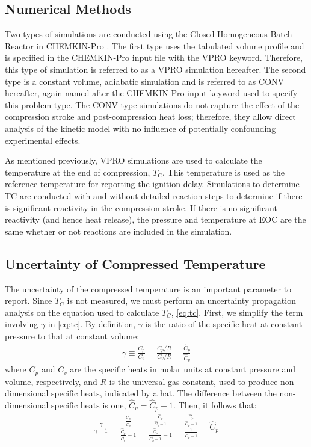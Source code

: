 \documentclass[../main.tex]{subfiles}
\begin{document}
\subsection{Numerical Methods}
Two types of simulations are conducted using the Closed Homogeneous
Batch Reactor in CHEMKIN-Pro \cite{Chemkin2012}. The first type uses the
tabulated volume profile and is specified in the CHEMKIN-Pro input file
with the VPRO keyword. Therefore, this type of simulation is referred to
as a VPRO simulation hereafter. The second type is a constant volume,
adiabatic simulation and is referred to as CONV hereafter, again named
after the CHEMKIN-Pro input keyword used to specify this problem type.
The CONV type simulations do not capture the effect of the compression
stroke and post-compression heat loss; therefore, they allow direct
analysis of the kinetic model with no influence of potentially
confounding experimental effects.

As mentioned previously, VPRO simulations are used to calculate the
temperature at the end of compression, $T_C$. This temperature is used
as the reference temperature for reporting the ignition delay.
Simulations to determine TC are conducted with and without detailed
reaction steps to determine if there is significant reactivity in the
compression stroke. If there is no significant reactivity
(and hence heat release), the pressure and temperature at EOC are the
same whether or not reactions are included in the simulation.

\subsection{Uncertainty of Compressed Temperature}
\label{sec:uncertainty}

The uncertainty of the compressed temperature is an important parameter
to report. Since $T_C$ is not measured, we must perform an uncertainty
propagation analysis on the equation used to calculate $T_C$,
\cref{eq:tc}. First, we simplify the term involving $\gamma$ in
\cref{eq:tc}. By definition, $\gamma$ is the ratio of the specific heat
at constant pressure to that at constant volume:
%
\begin{align}
\gamma \equiv \frac{C_p}{C_v} = \frac{C_p/R}{C_v/R} = \frac{\hat{C}_p}{\hat{C}_v}
\end{align}
%
where $C_p$ and $C_v$ are the specific heats in molar units at constant
pressure and volume, respectively, and $R$ is the universal gas constant,
used to produce non-dimensional specific heats, indicated by a hat. The
difference between the non-dimensional specific heats is one,
$\hat{C}_v = \hat{C}_p - 1$. Then, it follows that:
%
\begin{align}
\label{eq:simplify-gamma}
\frac{\gamma}{\gamma - 1} = \frac{\frac{\hat{C}_p}{\hat{C}_v}}{\frac{\hat{C}_p}{\hat{C}_v} - 1}
= \frac{\frac{\hat{C}_p}{\hat{C}_p - 1}}{\frac{\hat{C}_p}{\hat{C}_p - 1} - 1}
= \frac{\frac{\hat{C}_p}{\hat{C}_p - 1}}{\frac{1}{\hat{C}_p - 1}}
= \hat{C}_p
\end{align}
\end{document}

